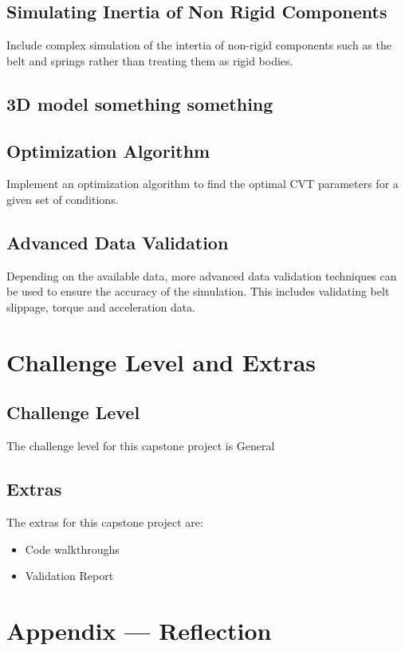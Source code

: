 \documentclass{article}
\begin{document}
\subsection{Simulating Inertia of Non Rigid Components}
Include complex simulation of the intertia of non-rigid components such as the belt and 
springs rather than treating them as rigid bodies.

\subsection{3D model something something}

\subsection{Optimization Algorithm}
Implement an optimization algorithm to find the optimal CVT parameters for a given set of 
conditions.

\subsection{Advanced Data Validation}
Depending on the available data, more advanced data validation techniques can be used to 
ensure the accuracy of the simulation. This includes validating belt slippage, torque and 
acceleration data.

\section{Challenge Level and Extras}

\subsection{Challenge Level}

The challenge level for this capstone project is General

\subsection{Extras}
The extras for this capstone project are:
\begin{itemize}
    \item Code walkthroughs
    \item Validation Report
\end{itemize}


\newpage{}

\section*{Appendix --- Reflection}
\end{document}
